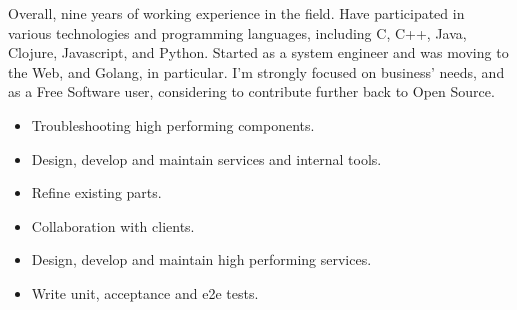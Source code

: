 \documentclass[10pt,a4paper,ragged2e,withhyper]{altacv}
\begin{document}


\makecvheader


Overall, nine years of working experience in the field. Have participated in various technologies and programming languages, including C, C++, Java, Clojure, Javascript, and Python. Started as a system engineer and was moving to the Web, and Golang, in particular. I'm strongly focused on business' needs, and as a Free Software user, considering to contribute further back to Open Source.

\begin{itemize}
\item Troubleshooting high performing components.
\item Design, develop and maintain services and internal tools.
\item Refine existing parts.
\item Collaboration with clients.
\end{itemize}
\divider

\begin{itemize}
\item Design, develop and maintain high performing services.
\item Write unit, acceptance and e2e tests.
\end{itemize}
\divider
\end{document}
